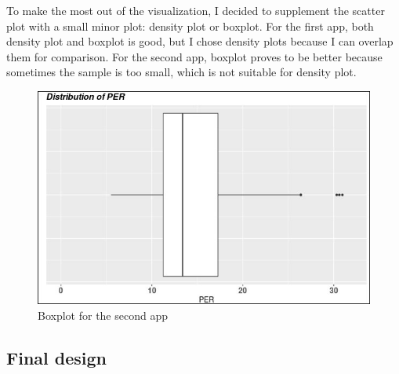 \documentclass[a4paper,12pt,twoside]{article}
\numberwithin{equation}{section}
\begin{document}
To make the most out of the visualization, I  decided to supplement the scatter plot with a small minor plot: density plot or boxplot. For the first app, both density plot and boxplot is good, but I chose density plots because I can overlap them for comparison. For the second app, boxplot proves to be better because sometimes the sample is too small, which is not suitable for density plot.
\begin{figure}[h]
\caption{Boxplot for the second app}
\includegraphics[scale=0.35]{box.jpg}
\centering
\end{figure}

\subsection{Final design}
\end{document}
